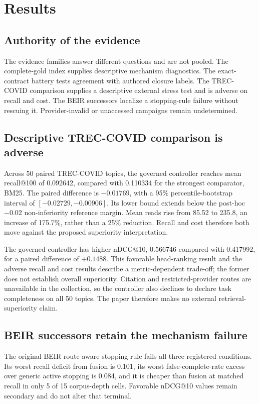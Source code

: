 \section{Results}
\label{sec:results}

\subsection{Authority of the evidence}
The evidence families answer different questions and are not pooled. The
complete-gold index supplies descriptive mechanism diagnostics. The
exact-contract battery tests agreement with authored closure labels. The
TREC-COVID comparison supplies a descriptive external stress test and is
adverse on recall and cost. The BEIR successors localize a stopping-rule failure
without rescuing it.
Provider-invalid or unaccessed campaigns remain undetermined.



\subsection{Descriptive TREC-COVID comparison is adverse}
Across 50 paired TREC-COVID topics, the governed controller reaches mean
recall@100 of 0.092642, compared with 0.110334 for the strongest comparator,
BM25. The paired difference is $-0.01769$, with a 95\% percentile-bootstrap
interval of $[-0.02729,-0.00906]$. Its lower bound extends below the post-hoc
$-0.02$ non-inferiority reference margin. Mean reads rise from 85.52 to 235.8,
an increase of 175.7\%, rather than a 25\% reduction. Recall and cost therefore
both move against the proposed superiority interpretation.

The governed controller has higher nDCG@10, 0.566746 compared with 0.417992,
for a paired difference of $+0.1488$. This favorable head-ranking result and
the adverse recall and cost results describe a metric-dependent trade-off; the
former does not establish overall superiority. Citation and restricted-provider
routes are unavailable in the collection, so the controller also declines to
declare task completeness on all 50 topics. The paper therefore makes no
external retrieval-superiority claim.

\subsection{BEIR successors retain the mechanism failure}
The original BEIR route-aware stopping rule fails all three registered
conditions. Its worst recall deficit from fusion is 0.101, its worst
false-complete-rate excess over generic active stopping is 0.084, and it is
cheaper than fusion at matched recall in only 5 of 15 corpus-depth cells.
Favorable nDCG@10 values remain secondary and do not alter that terminal.


